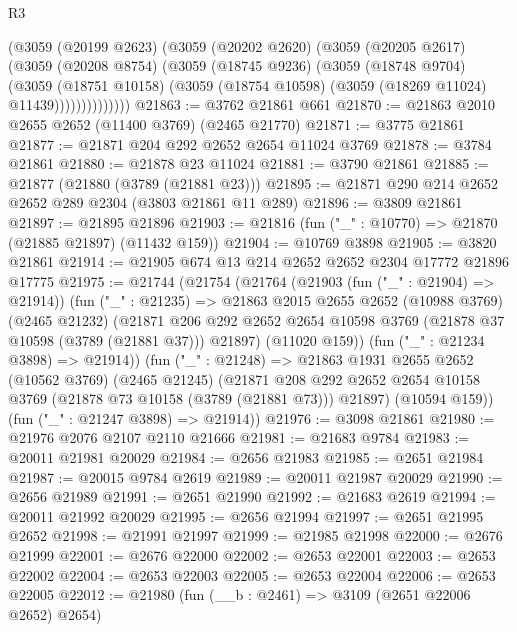 \begin{lexlean}{R3}
\begin{coremodule}
              (@3059
                (@20199 @2623)
                (@3059
                  (@20202 @2620)
                  (@3059
                    (@20205 @2617)
                    (@3059
                      (@20208 @8754)
                      (@3059
                        (@18745 @9236)
                        (@3059
                          (@18748 @9704)
                          (@3059
                            (@18751 @10158)
                            (@3059 (@18754 @10598) (@3059 (@18269 @11024) @11439))))))))))))))
@21863 := @3762 @21861 @661
@21870 := @21863 @2010 @2655 @2652 (@11400 @3769) (@2465 @21770)
@21871 := @3775 @21861
@21877 := @21871 @204 @292 @2652 @2654 @11024 @3769
@21878 := @3784 @21861
@21880 := @21878 @23 @11024
@21881 := @3790 @21861
@21885 := @21877 (@21880 (@3789 (@21881 @23)))
@21895 := @21871 @290 @214 @2652 @2652 @289 @2304 (@3803 @21861 @11 @289)
@21896 := @3809 @21861
@21897 := @21895 @21896
@21903 := @21816 (fun ("_" : @10770) => @21870 (@21885 @21897) (@11432 @159))
@21904 := @10769 @3898
@21905 := @3820 @21861
@21914 := @21905 @674 @13 @214 @2652 @2652 @2304 @17772 @21896 @17775
@21975 := @21744
    (@21754
      (@21764
        (@21903 (fun ("_" : @21904) => @21914))
        (fun ("_" : @21235) =>
        @21863
          @2015
          @2655
          @2652
          (@10988 @3769)
          (@2465 @21232)
          (@21871
            @206
            @292
            @2652
            @2654
            @10598
            @3769
            (@21878 @37 @10598 (@3789 (@21881 @37)))
            @21897)
          (@11020 @159))
        (fun ("_" : @21234 @3898) => @21914))
      (fun ("_" : @21248) =>
      @21863
        @1931
        @2655
        @2652
        (@10562 @3769)
        (@2465 @21245)
        (@21871 @208 @292 @2652 @2654 @10158 @3769 (@21878 @73 @10158 (@3789 (@21881 @73))) @21897)
        (@10594 @159))
      (fun ("_" : @21247 @3898) => @21914))
@21976 := @3098 @21861
@21980 := @21976 @2076 @2107 @2110 @21666
@21981 := @21683 @9784
@21983 := @20011 @21981 @20029
@21984 := @2656 @21983
@21985 := @2651 @21984
@21987 := @20015 @9784 @2619
@21989 := @20011 @21987 @20029
@21990 := @2656 @21989
@21991 := @2651 @21990
@21992 := @21683 @2619
@21994 := @20011 @21992 @20029
@21995 := @2656 @21994
@21997 := @2651 @21995 @2652
@21998 := @21991 @21997
@21999 := @21985 @21998
@22000 := @2676 @21999
@22001 := @2676 @22000
@22002 := @2653 @22001
@22003 := @2653 @22002
@22004 := @2653 @22003
@22005 := @2653 @22004
@22006 := @2653 @22005
@22012 := @21980 (fun (__b : @2461) => @3109 (@2651 @22006 @2652) @2654)

\end{coremodule}
\end{lexlean}
